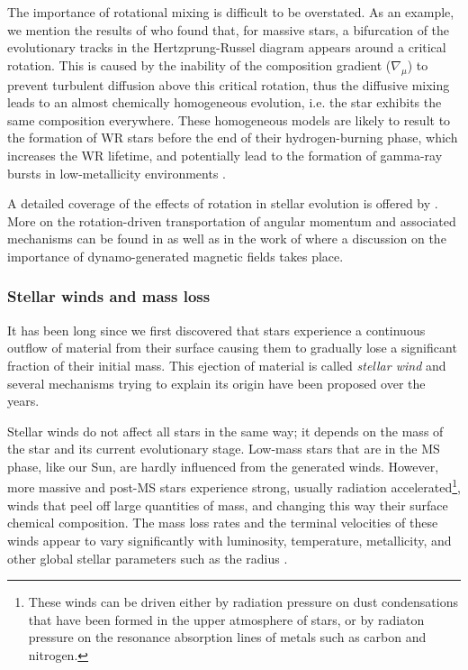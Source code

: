 \documentclass[../../main/thesis_msc.tex]{subfiles}
\begin{document}
						The importance of rotational mixing is difficult to be overstated. As an example, we mention the results of \cite{Maeder1987} who found that, for massive stars, a bifurcation of the evolutionary tracks in the Hertzprung-Russel diagram appears around a critical rotation. This is caused by the inability of the composition gradient ($\nabla_{\mu}$) to prevent turbulent diffusion above this critical rotation, thus the diffusive mixing leads to an almost chemically homogeneous evolution, i.e. the star exhibits the same composition everywhere. These homogeneous models are likely to result to the formation of WR stars before the end of their hydrogen-burning phase, which increases the WR lifetime, and potentially lead to the formation of gamma-ray bursts in low-metallicity environments \citep{Yoon2005}.
						
						A detailed coverage of the effects of rotation in stellar evolution is offered by \cite{Langer1997, Heger2000, Hirschi, Maeder2006, langer12, Palacios}. More on the rotation-driven transportation of angular momentum and associated mechanisms can be found in \cite{Heger2005, langer12} as well as in the work of \cite{Spruit2002} where a discussion on the importance of dynamo-generated magnetic fields takes place.
						
						
						
						
					\subsubsection{Stellar winds and mass loss}
					
						It has been long since we first discovered that stars experience a continuous outflow of material from their surface causing them to gradually lose a significant fraction of their initial mass. This ejection of material is called \emph{stellar wind} and several mechanisms trying to explain its origin have been proposed over the years.
						
						Stellar winds do not affect all stars in the same way; it depends on the mass of the star and its current evolutionary stage. Low-mass stars that are in the MS phase, like our Sun, are hardly influenced from the generated winds. However, more massive and post-MS stars experience strong, usually radiation accelerated\footnote{These winds can be driven either by radiation pressure on dust condensations that have been formed in the upper atmosphere of stars, or by radiaton pressure on the resonance absorption lines of metals such as carbon and nitrogen.}, winds that peel off large quantities of mass, and changing this way their surface chemical composition. The mass loss rates and the terminal velocities of these winds appear to vary significantly with luminosity, temperature, metallicity, and other global stellar parameters such as the radius \citep{Hamann1982, deJager1988, Nugis2000, yoon17}.
						
\end{document}
